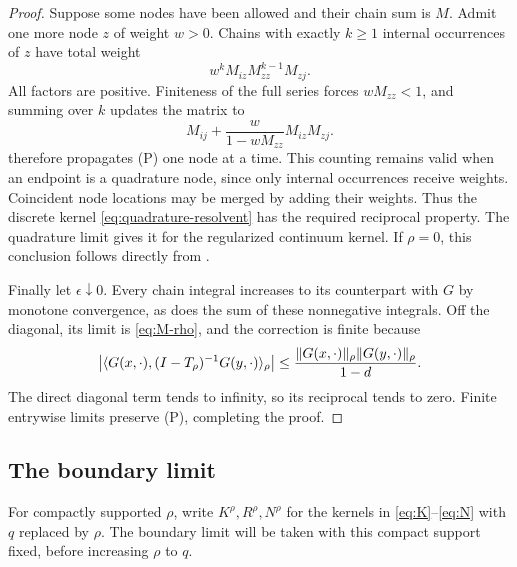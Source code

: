 \begin{proof}
Suppose some nodes have been allowed and their chain sum is $M$. Admit one more node $z$ of weight $w>0$. Chains with exactly $k\ge1$ internal occurrences of $z$ have total weight
\[
w^kM_{iz}M_{zz}^{k-1}M_{zj}.
\]
All factors are positive. Finiteness of the full series forces $wM_{zz}<1$, and summing over $k$ updates the matrix to
\begin{equation}\label{eq:elimination}
M_{ij}+\frac{w}{1-wM_{zz}}M_{iz}M_{zj}.
\end{equation}
 therefore propagates \textup{(P)} one node at a time. This counting remains valid when an endpoint is a quadrature node, since only internal occurrences receive weights. Coincident node locations may be merged by adding their weights. Thus the discrete kernel \eqref{eq:quadrature-resolvent} has the required reciprocal property. The quadrature limit gives it for the regularized continuum kernel. If $\rho=0$, this conclusion follows directly from .

Finally let $\epsilon\downarrow0$. Every chain integral increases to its counterpart with $G$ by monotone convergence, as does the sum of these nonnegative integrals. Off the diagonal, its limit is \eqref{eq:M-rho}, and the correction is finite because
\[
\big|\langle G(x,\cdot),(I-T_\rho)^{-1}G(y,\cdot)\rangle_\rho\big|
\le\frac{\lVert G(x,\cdot)\rVert_\rho\lVert G(y,\cdot)\rVert_\rho}{1-d}.
\]
The direct diagonal term tends to infinity, so its reciprocal tends to zero. Finite entrywise limits preserve \textup{(P)}, completing the proof.
\end{proof}

\subsection{The boundary limit}

For compactly supported $\rho$, write $K^\rho,R^\rho,N^\rho$ for the kernels in \eqref{eq:K}--\eqref{eq:N} with $q$ replaced by $\rho$. The boundary limit will be taken with this compact support fixed, before increasing $\rho$ to $q$.

